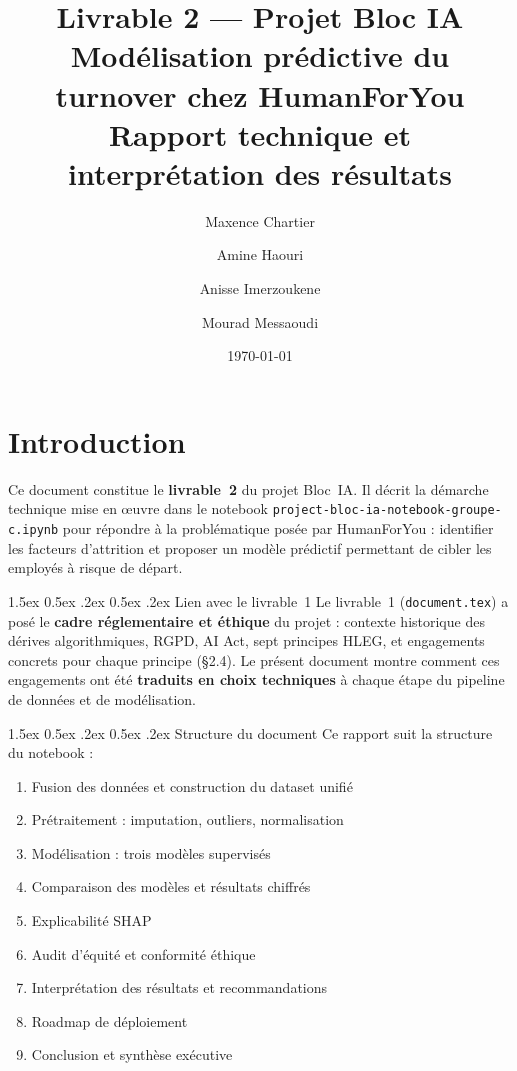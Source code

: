 \documentclass[12pt,a4paper]{article}
\title{Livrable 2 --- Projet Bloc IA \\ \Large Modélisation prédictive du turnover chez HumanForYou \\ \large Rapport technique et interprétation des résultats}
\author{
    Maxence Chartier \and
    Amine Haouri \and
    Anisse Imerzoukene \and
    Mourad Messaoudi
}
\date{\today}
\makeatletter
\renewcommand\paragraph{\@startsection{paragraph}{4}{\z@}%
  {1.5ex \@plus 0.5ex \@minus .2ex}%
  {0.5ex \@plus .2ex}%
  {\normalfont\normalsize\bfseries}}
\makeatother
\begin{document}
\maketitle
\thispagestyle{empty}
\newpage
{\small
\tableofcontents
}
\newpage

\section{Introduction}

Ce document constitue le \textbf{livrable~2} du projet Bloc~IA. Il décrit la démarche technique mise en \oe uvre dans le notebook \texttt{project-bloc-ia-notebook-groupe-c.ipynb} pour répondre à la problématique posée par HumanForYou : identifier les facteurs d'attrition et proposer un modèle prédictif permettant de cibler les employés à risque de départ.

\paragraph{Lien avec le livrable~1} Le livrable~1 (\texttt{document.tex}) a posé le \textbf{cadre réglementaire et éthique} du projet : contexte historique des dérives algorithmiques, RGPD, AI Act, sept principes HLEG, et engagements concrets pour chaque principe (§2.4). Le présent document montre comment ces engagements ont été \textbf{traduits en choix techniques} à chaque étape du pipeline de données et de modélisation.

\paragraph{Structure du document} Ce rapport suit la structure du notebook :
\begin{enumerate}
    \item Fusion des données et construction du dataset unifié
    \item Prétraitement : imputation, outliers, normalisation
    \item Modélisation : trois modèles supervisés
    \item Comparaison des modèles et résultats chiffrés
    \item Explicabilité SHAP
    \item Audit d'équité et conformité éthique
    \item Interprétation des résultats et recommandations
    \item Roadmap de déploiement
    \item Conclusion et synthèse exécutive
\end{enumerate}
\end{document}
